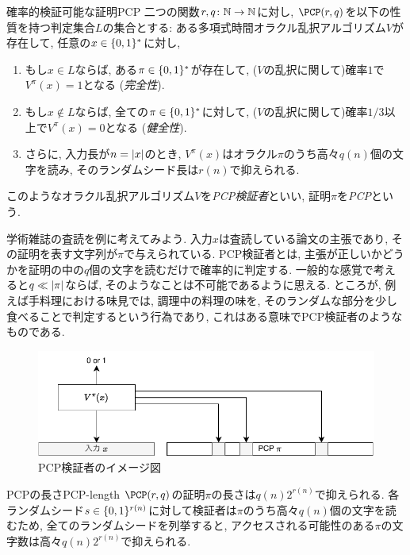 \begin{definition}{確率的検証可能な証明}{PCP}
  二つの関数$r,q\colon\mathbb{N}\to\mathbb{N}$に対し, $\PCP(r,q)$を以下の性質を持つ判定集合$L$の集合とする: ある多項式時間オラクル乱択アルゴリズム$V$が存在して, 任意の$x\in\{0,1\}^*$に対し,
  \begin{enumerate}
  \item もし$x\in L$ならば, ある$\pi\in\{0,1\}^*$が存在して, ($V$の乱択に関して)確率$1$で$V^\pi(x)=1$となる (\emph{完全性}).
  \item もし$x\notin L$ならば, 全ての$\pi\in\{0,1\}^*$に対して, ($V$の乱択に関して)確率$1/3$以上で$V^\pi(x)=0$となる (\emph{健全性}).
  \item さらに, 入力長が$n=\abs{x}$のとき, $V^\pi(x)$はオラクル$\pi$のうち高々$q(n)$個の文字を読み, そのランダムシード長は$r(n)$で抑えられる.
  \end{enumerate}
  このようなオラクル乱択アルゴリズム$V$を\emph{PCP検証者}といい, 証明$\pi$を\emph{PCP}という.
\end{definition}

学術雑誌の査読を例に考えてみよう.
入力$x$は査読している論文の主張であり, その証明を表す文字列が$\pi$で与えられている.
PCP検証者とは, 主張が正しいかどうかを証明の中の$q$個の文字を読むだけで確率的に判定する.
一般的な感覚で考えると$q\ll \abs{\pi}$ならば, そのようなことは不可能であるように思える.
ところが, 例えば手料理における味見では, 調理中の料理の味を, そのランダムな部分を少し食べることで判定するという行為であり, これはある意味でPCP検証者のようなものである.

\begin{figure}[htbp]
  \centering
  \includegraphics[width=\textwidth]{images/PCPverifier.pdf}
  \caption{PCP検証者のイメージ図}
  \label{fig:PCPverifier}
\end{figure}

\begin{remark}{PCPの長さ}{PCP-length}
  $\PCP(r,q)$の証明$\pi$の長さは$q(n)2^{r(n)}$で抑えられる.
  各ランダムシード$s \in \{0,1\}^{r(n)}$に対して検証者は$\pi$のうち高々$q(n)$個の文字を読むため, 全てのランダムシードを列挙すると, アクセスされる可能性のある$\pi$の文字数は高々$q(n)2^{r(n)}$で抑えられる.
\end{remark}

